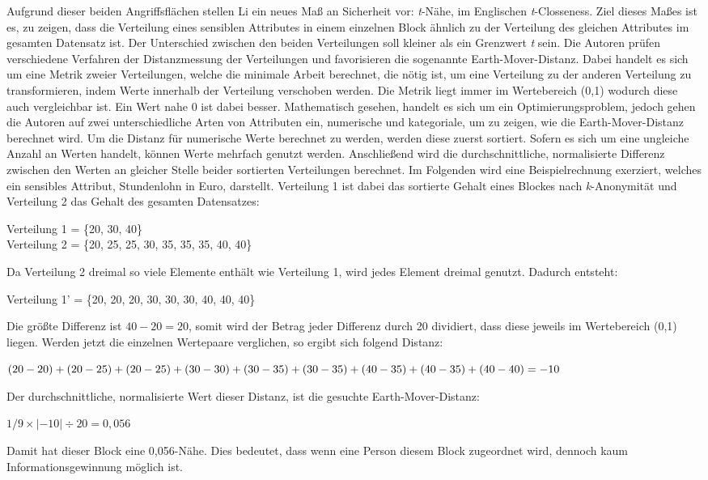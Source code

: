Aufgrund dieser beiden Angriffsflächen stellen Li \etal \cite{P-25} ein neues Maß an Sicherheit vor: \textit{t}-Nähe, im Englischen \textit{t}-Closseness.
Ziel dieses Maßes ist es, zu zeigen, dass die Verteilung eines sensiblen Attributes in einem einzelnen Block ähnlich zu der Verteilung des gleichen Attributes im gesamten Datensatz ist.
Der Unterschied zwischen den beiden Verteilungen soll kleiner als ein Grenzwert \textit{t} sein.
Die Autoren prüfen verschiedene Verfahren der Distanzmessung der Verteilungen und favorisieren die sogenannte Earth-Mover-Distanz.
Dabei handelt es sich um eine Metrik zweier Verteilungen, welche die minimale Arbeit berechnet, die nötig ist, um eine Verteilung zu der anderen Verteilung zu transformieren, indem Werte innerhalb der Verteilung verschoben werden. 
Die Metrik liegt immer im Wertebereich (0,1) wodurch diese auch vergleichbar ist. 
Ein Wert nahe 0 ist dabei besser.
Mathematisch gesehen, handelt es sich um ein Optimierungsproblem, jedoch gehen die Autoren auf zwei unterschiedliche Arten von Attributen ein, numerische und kategoriale, um zu zeigen, wie die Earth-Mover-Distanz berechnet wird.
Um die Distanz für numerische Werte berechnet zu werden, werden diese zuerst sortiert. 
Sofern es sich um eine ungleiche Anzahl an Werten handelt, können Werte mehrfach genutzt werden.
Anschließend wird die durchschnittliche, normalisierte Differenz zwischen den Werten an gleicher Stelle beider sortierten Verteilungen berechnet.
Im Folgenden wird eine Beispielrechnung exerziert, welches ein sensibles Attribut, Stundenlohn in Euro, darstellt. 
Verteilung 1 ist dabei das sortierte Gehalt eines Blockes nach \textit{k}-Anonymität und Verteilung 2 das Gehalt des gesamten Datensatzes:
\begin{addmargin}[25pt]{0pt} Verteilung 1 = \{20, 30, 40\} \\
Verteilung 2 = \{20, 25, 25, 30, 35, 35, 35, 40, 40\} \end{addmargin}
Da Verteilung 2 dreimal so viele Elemente enthält wie Verteilung 1, wird jedes Element dreimal genutzt. 
Dadurch entsteht:
\begin{addmargin}[25pt]{0pt}Verteilung 1' = \{20, 20, 20, 30, 30, 30, 40, 40, 40\} \end{addmargin}
Die größte Differenz ist $40-20 = 20$, somit wird der Betrag jeder Differenz durch 20 dividiert, dass diese jeweils im Wertebereich (0,1) liegen.
Werden jetzt die einzelnen Wertepaare verglichen, so ergibt sich folgend Distanz:
\begin{addmargin}[25pt]{0pt}
$ (20-20)+(20-25)+(20-25)+(30-30)+(30-35)+(30-35)+(40-35)+\\ (40-35) + (40-40) = -10$
\end{addmargin}
Der durchschnittliche, normalisierte Wert dieser Distanz, ist die gesuchte Earth-Mover-Distanz:
\begin{addmargin}[25pt]{0pt}
$ 1/9 \times  |-10| \div 20 = 0,056$
\end{addmargin}
Damit hat dieser Block eine 0,056-Nähe.
Dies bedeutet, dass wenn eine Person diesem Block zugeordnet wird, dennoch kaum Informationsgewinnung möglich ist.

